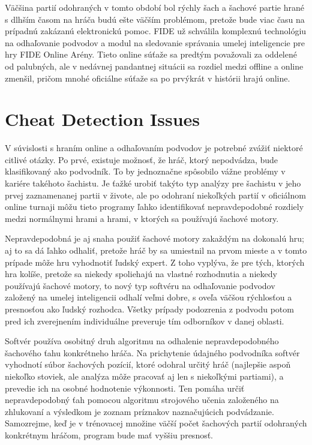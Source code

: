 \documentclass[10pt,twoside,slovak,a4paper]{article}
\begin{document}
Väčšina partií odohraných v tomto období bol rýchly šach a šachové partie hrané s dlhším časom na hráča budú ešte väčším problémom, pretože bude viac času na prípadnú zakázanú elektronickú pomoc. FIDE už schválila komplexnú technológiu na odhaľovanie podvodov a modul na sledovanie správania umelej inteligencie pre hry FIDE Online Arény. Tieto online súťaže sa predtým považovali za oddelené od palubných, ale v nedávnej pandantnej situácii sa rozdiel medzi offline a online zmenšil, pričom mnohé oficiálne súťaže sa po prvýkrát v histórii hrajú online.





\section{Cheat Detection Issues}

V súvislosti s hraním online a odhaľovaním podvodov je potrebné zvážiť niektoré citlivé otázky. Po prvé, existuje možnosť, že hráč, ktorý nepodvádza, bude klasifikovaný ako podvodník. To by jednoznačne spôsobilo vážne problémy v kariére takéhoto šachistu. Je ťažké urobiť takýto typ analýzy pre šachistu v jeho prvej zaznamenanej partii v živote, ale po odohraní niekoľkých partií v oficiálnom online turnaji môžu tieto programy ľahko identifikovať nepravdepodobné rozdiely medzi normálnymi hrami a hrami, v ktorých sa používajú šachové motory.

Nepravdepodobná je aj snaha použiť šachové motory zakaždým na dokonalú hru; aj to sa dá ľahko odhaliť, pretože hráč by sa umiestnil na prvom mieste a v tomto prípade môže hru vyhodnotiť ľudský expert. Z toho vyplýva, že pre tých, ktorých hra kolíše, pretože sa niekedy spoliehajú na vlastné rozhodnutia a niekedy používajú šachové motory, to nový typ softvéru na odhaľovanie podvodov založený na umelej inteligencii odhalí veľmi dobre, s oveľa väčšou rýchlosťou a presnosťou ako ľudský rozhodca. Všetky prípady podozrenia z podvodu potom pred ich zverejnením individuálne preveruje tím odborníkov v danej oblasti.

Softvér používa osobitný druh algoritmu na odhalenie nepravdepodobného šachového ťahu konkrétneho hráča. Na prichytenie údajného podvodníka softvér vyhodnotí súbor šachových pozícií, ktoré odohral určitý hráč (najlepšie aspoň niekoľko stoviek, ale analýza môže pracovať aj len s niekoľkými partiami), a prevedie ich na osobné hodnotenie výkonnosti. Ten pomáha určiť nepravdepodobný ťah pomocou algoritmu strojového učenia založeného na zhlukovaní a výsledkom je zoznam príznakov naznačujúcich podvádzanie. Samozrejme, keď je v trénovacej množine väčší počet šachových partií odohraných konkrétnym hráčom, program bude mať vyššiu presnosť.
\end{document}

